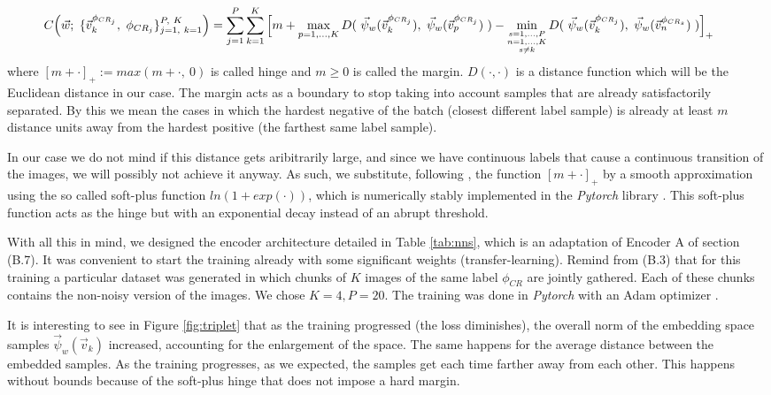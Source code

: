 \documentclass[11pt, a4paper, twoside]{article} %
\begin{document}
\begin{equation}\hspace*{-0.5cm}\small 
C\qty(\vec{w};\ \{\vec{v}_k^{\phi_{CR_j}},\ \phi_{CR_j}\}_{j=1,\ k=1}^{P,\ K})=\sum_{j=1}^P\sum_{k=1}^K\Big[ m+\max_{p=1,...,K}D(\ \vec{\psi}_w(\vec{v}_k^{\phi_{CR_j}}),\ \vec{\psi}_w(\vec{v}_p^{\phi_{CR_j}})\ ) - \min_{\substack{s=1,...,P\\ n=1,...,K\\ s\neq k}}D(\ \vec{\psi}_w(\vec{v}_k^{\phi_{CR_j}}),\ \vec{\psi}_w(\vec{v}_n^{\phi_{CR_s}})\ )\Big]_+\vspace{-0.3cm}
\end{equation}
\newpage
\noindent where $[m+\cdot]_+:=max(m+\cdot,\ 0)$ is called hinge and $m\geq 0$ is called the margin. $D(\cdot,\cdot)$ is a distance function which will be the Euclidean distance in our case. The margin acts as a boundary to stop taking into account samples that are already satisfactorily separated. By this we mean the cases in which the hardest negative of the batch (closest different label sample) is already at least $m$ distance units away from the hardest positive (the farthest same label sample).\vspace{-0.05cm}

In our case we do not mind if this distance gets aribitrarily large, and since we have continuous labels that cause a continuous transition of the images, we will possibly not achieve it anyway. As such, we substitute, following \cite{triplet}, the function $[m+\cdot]_+$ by a smooth approximation using the so called soft-plus function $ln(1+exp(\cdot))$, which is numerically stably implemented in the {\em Pytorch} library \cite{pytorch}. This soft-plus function acts as the hinge but with an exponential decay instead of an abrupt threshold.\vspace{-0.05cm}

With all this in mind, we designed the encoder architecture detailed in Table \ref{tab:nns}, which is an adaptation of Encoder A of section (B.7). It was convenient to start the training already with some significant weights (transfer-learning). Remind from (B.3) that for this training a particular dataset was generated in which chunks of $K$ images of the same label $\phi_{CR}$ are jointly gathered. Each of these chunks contains the non-noisy version of the images. We chose $K=4,P=20$. The training was done in {\em Pytorch} with an Adam optimizer \cite{adam}.\vspace{-0.05cm}

It is interesting to see in Figure \ref{fig:triplet} that as the training progressed (the loss diminishes), the overall norm of the embedding space samples $\vec{\psi}_w(\vec{v}_k)$ increased, accounting for the enlargement of the space. The same happens for the average distance between the embedded samples. As the training progresses, as we expected, the samples get each time farther away from each other. This happens without bounds because of the soft-plus hinge that does not impose a hard margin.\vspace{-0.05cm}
\end{document}
